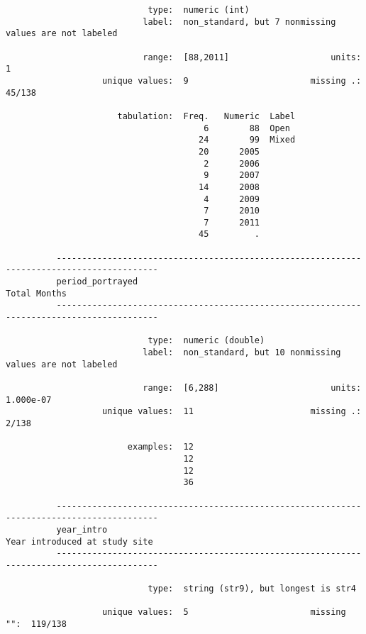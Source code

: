 \documentclass{article}
\begin{document}
\begin{verbatim}
                            type:  numeric (int)
                           label:  non_standard, but 7 nonmissing values are not labeled
          
                           range:  [88,2011]                    units:  1
                   unique values:  9                        missing .:  45/138
          
                      tabulation:  Freq.   Numeric  Label
                                       6        88  Open
                                      24        99  Mixed
                                      20      2005  
                                       2      2006  
                                       9      2007  
                                      14      2008  
                                       4      2009  
                                       7      2010  
                                       7      2011  
                                      45         .  
          
          ------------------------------------------------------------------------------------------
          period_portrayed                                                              Total Months
          ------------------------------------------------------------------------------------------
          
                            type:  numeric (double)
                           label:  non_standard, but 10 nonmissing values are not labeled
          
                           range:  [6,288]                      units:  1.000e-07
                   unique values:  11                       missing .:  2/138
          
                        examples:  12    
                                   12    
                                   12    
                                   36    
          
          ------------------------------------------------------------------------------------------
          year_intro                                                   Year introduced at study site
          ------------------------------------------------------------------------------------------
          
                            type:  string (str9), but longest is str4
          
                   unique values:  5                        missing "":  119/138
          

\end{verbatim}
\end{document}
